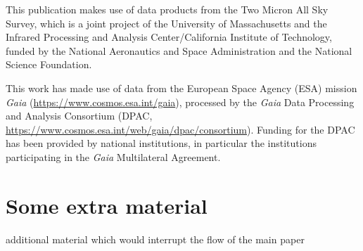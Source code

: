 \documentclass[fleqn,usenatbib,letters]{mnras}%
\begin{document}
This publication makes use of data products from the Two Micron All Sky Survey, which is a joint project of the University of Massachusetts and the Infrared Processing and Analysis Center/California Institute of Technology, funded by the National Aeronautics and Space Administration and the National Science Foundation.

This work has made use of data from the European Space Agency (ESA) mission {\it Gaia} (\url{https://www.cosmos.esa.int/gaia}), processed by the {\it Gaia} Data Processing and Analysis Consortium (DPAC, \url{https://www.cosmos.esa.int/web/gaia/dpac/consortium}). Funding for the DPAC has been provided by national institutions, in particular the institutions participating in the {\it Gaia} Multilateral Agreement.










\appendix

\section{Some extra material}

additional material which would interrupt the flow of the main paper




\bsp	%
\label{lastpage}
\end{document}
